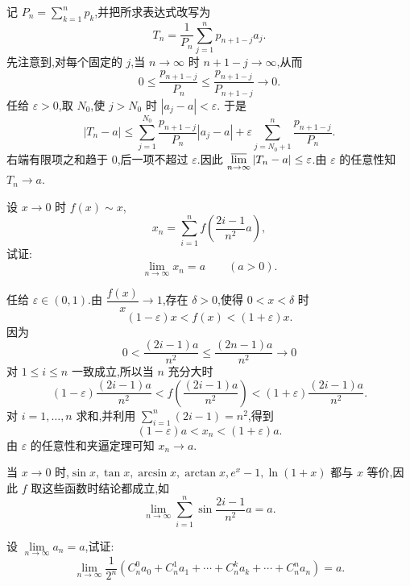 \begin{solution}
  记 $P_n=\displaystyle \sum\limits_{k=1}^n p_k$,并把所求表达式改写为
  \[
    T_n=\dfrac{1}{P_n}\sum\limits_{j=1}^n p_{n+1-j}a_j.
  \]
  先注意到,对每个固定的 $j$,当 $n\to\infty$ 时 $n+1-j\to\infty$,从而
  \[
    0\leq\dfrac{p_{n+1-j}}{P_n}
    \leq\dfrac{p_{n+1-j}}{P_{n+1-j}}\longrightarrow0.
  \]
  任给 $\varepsilon>0$,取 $N_0$,使 $j>N_0$ 时 $|a_j-a|<\varepsilon$.
  于是
  \[
    |T_n-a|
    \leq \sum\limits_{j=1}^{N_0}
    \dfrac{p_{n+1-j}}{P_n}|a_j-a|
    +\varepsilon\sum\limits_{j=N_0+1}^{n}\dfrac{p_{n+1-j}}{P_n}.
  \]
  右端有限项之和趋于 $0$,后一项不超过 $\varepsilon$.因此
  $\varlimsup\limits_{n\to\infty}|T_n-a|\leq\varepsilon$.由 $\varepsilon$ 的任意性知 $T_n\to a$.
\end{solution}

\begin{example}
  设 $x\to0$ 时 $f(x)\sim x$,
  \[
    x_n=\sum\limits_{i=1}^n f\left(\dfrac{2i-1}{n^2}a\right),
  \]
  试证:
  \[
    \displaystyle\lim\limits_{n\to\infty}x_n=a\qquad(a>0).
  \]
\end{example}
\exampleblank

\begin{solution}
  任给 $\varepsilon\in(0,1)$.由 $\dfrac{f(x)}{x}\to1$,存在 $\delta>0$,使得
  $0<x<\delta$ 时
  \[
    (1-\varepsilon)x<f(x)<(1+\varepsilon)x.
  \]
  因为
  \[
    0<\dfrac{(2i-1)a}{n^2}
    \leq\dfrac{(2n-1)a}{n^2}\longrightarrow0
  \]
  对 $1\leq i\leq n$ 一致成立,所以当 $n$ 充分大时
  \[
    (1-\varepsilon)\dfrac{(2i-1)a}{n^2}
    <f\left(\dfrac{(2i-1)a}{n^2}\right)
    <(1+\varepsilon)\dfrac{(2i-1)a}{n^2}.
  \]
  对 $i=1,\ldots,n$ 求和,并利用
  $\displaystyle\sum\limits_{i=1}^n(2i-1)=n^2$,得到
  \[
    (1-\varepsilon)a<x_n<(1+\varepsilon)a.
  \]
  由 $\varepsilon$ 的任意性和夹逼定理可知 $x_n\to a$.
\end{solution}

\begin{remark}
  当 $x\to0$ 时,$\sin x,\tan x,\arcsin x,\arctan x,e^x-1,\ln(1+x)$ 都与 $x$ 等价,因此 $f$ 取这些函数时结论都成立,如
  \[
    \displaystyle\lim\limits_{n\to\infty}\sum\limits_{i=1}^n
    \sin\dfrac{2i-1}{n^2}a=a.
  \]
\end{remark}

\begin{example}
  设 $\displaystyle \lim\limits_{n\to\infty}a_n=a$,试证:
  \[
    \displaystyle\lim\limits_{n\to\infty}\dfrac{1}{2^n}
    \left(
    C_{n}^{0}a_0+C_{n}^{1}a_1+\cdots+C_{n}^{k}a_k+\cdots+C_{n}^{n}a_n
    \right)=a.
  \]
\end{example}
\exampleblank

